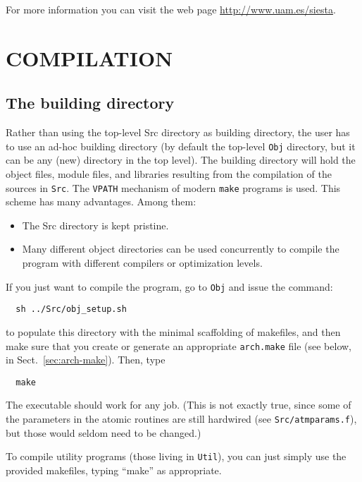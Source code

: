 \documentclass[11pt]{article}
\begin{document}
For more information you can visit the web page
\url{http://www.uam.es/siesta}.

\section{COMPILATION}

\subsection{The building directory}

Rather than using the top-level Src directory as building directory,
the user has to use an ad-hoc building directory (by default the
top-level {\tt Obj} directory, but it can be any (new) directory in
the top level).  The building directory will hold the object files,
module files, and libraries resulting from the compilation of the
sources in {\tt Src}.  The {\tt VPATH} mechanism of modern {\tt make}
programs is used. This scheme has many advantages. Among them:

\begin{itemize}
\item The Src directory is kept pristine.
\item Many different object directories can be used concurrently to
  compile the program with different compilers or optimization levels.
\end{itemize}

If you just want to compile the program, go to {\tt Obj} and issue the
command:

\begin{verbatim}
  sh ../Src/obj_setup.sh
\end{verbatim}

to populate this directory with the minimal scaffolding of makefiles,
and then make sure that you create or generate an appropriate {\tt arch.make}
file (see below, in Sect.~\ref{sec:arch-make}). Then, type

\begin{verbatim}
  make
\end{verbatim}

The executable should work for any job. (This is not exactly true,
since some of the parameters in the atomic routines are still
hardwired (see {\tt Src/atmparams.f}), but those would seldom need to
be changed.)

To compile utility programs (those living in {\tt Util}), you can just
simply use the provided makefiles, typing ``make'' as appropriate.
\end{document}
